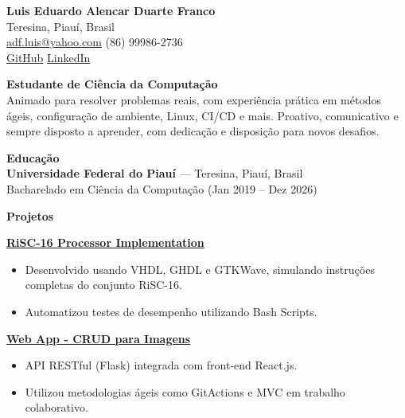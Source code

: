 \documentclass[a4paper,10pt]{article}
\newcommand{\heading}[1]{\noindent\textbf{\Large{#1}}}
\newcommand{\subheading}[1]{\noindent\textbf{\normalsize{#1}}} %
\begin{document}
\begin{center}
    {\huge \textbf{Luis Eduardo Alencar Duarte Franco}} \\
    Teresina, Piauí, Brasil \\
    \href{mailto:adf.luis@yahoo.com}{adf.luis@yahoo.com} \textbullet{} (86) 99986-2736 \\
    \href{https://github.com/seu-usuario}{GitHub} \textbullet{} \href{https://linkedin.com/in/seu-usuario}{LinkedIn}
\end{center}

\vspace{0.5cm}

\heading{Estudante de Ciência da Computação} \\ 
Animado para resolver problemas reais, com experiência prática em métodos ágeis, configuração de ambiente, Linux, CI/CD e mais. Proativo, comunicativo e sempre disposto a aprender, com dedicação e disposição para novos desafios.

\vspace{0.5cm}

\heading{Educação} \\
\textbf{Universidade Federal do Piauí} — Teresina, Piauí, Brasil \\
Bacharelado em Ciência da Computação (Jan 2019 – Dez 2026)

\vspace{0.5cm}

\heading{Projetos}

\vspace{0.3cm}

\noindent
\subheading{\href{https://github.com/luisedu-adf/risc16}{RiSC-16 Processor Implementation}}  
\begin{itemize}[noitemsep]
    \item Desenvolvido usando VHDL, GHDL e GTKWave, simulando instruções completas do conjunto RiSC-16.
    \item Automatizou testes de desempenho utilizando Bash Scripts.
\end{itemize}


\noindent
\subheading{\href{https://github.com/es20231/eqp3}{Web App - CRUD para Imagens}}  
\begin{itemize}[noitemsep]
    \item API RESTful (Flask) integrada com front-end React.js.
    \item Utilizou metodologias ágeis como GitActions e MVC em trabalho colaborativo.
\end{itemize}
\end{document}
